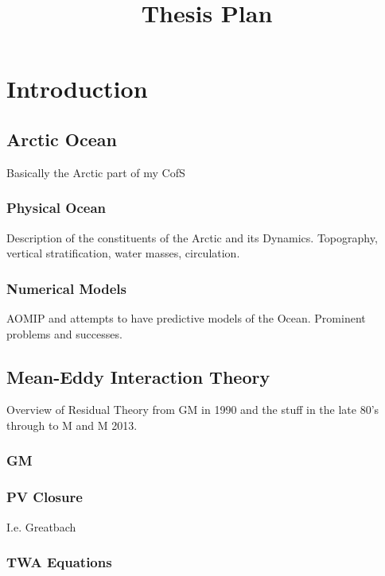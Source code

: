 \documentclass[10pt,a4paper]{article}
\title{Thesis Plan}
\begin{document}
\maketitle


\section{Introduction}

\subsection{Arctic Ocean}

Basically the Arctic part of my CofS

\subsubsection{Physical Ocean}

Description of the constituents of the Arctic
and its Dynamics. Topography,
vertical stratification, water masses, circulation.

\subsubsection{Numerical Models}

AOMIP and attempts to have predictive models of
the Ocean. Prominent problems and successes.

\subsection{Mean-Eddy Interaction Theory}

Overview of Residual Theory from GM in 1990 and the
stuff in the late 80's through to M and M 2013.

\subsubsection{GM}

\subsubsection{PV Closure}

I.e. Greatbach

\subsubsection{TWA Equations}
\end{document}
